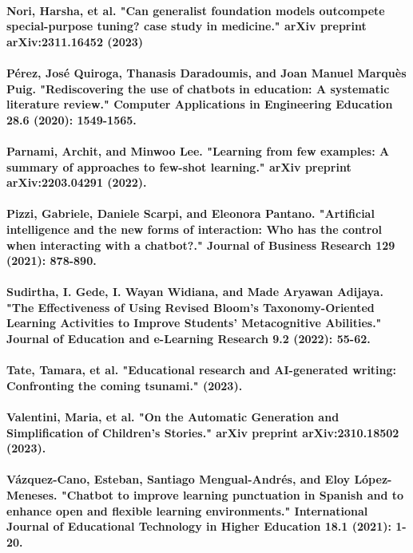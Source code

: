 \documentclass{article}
\begin{document}
\paragraph{Nori, Harsha, et al. "Can generalist foundation models outcompete special-purpose tuning? case study in medicine." arXiv preprint arXiv:2311.16452 (2023)}
\paragraph{Pérez, José Quiroga, Thanasis Daradoumis, and Joan Manuel Marquès Puig. "Rediscovering the use of chatbots in education: A systematic literature review." Computer Applications in Engineering Education 28.6 (2020): 1549-1565.}
\paragraph{Parnami, Archit, and Minwoo Lee. "Learning from few examples: A summary of approaches to few-shot learning." arXiv preprint arXiv:2203.04291 (2022).}
\paragraph{Pizzi, Gabriele, Daniele Scarpi, and Eleonora Pantano. "Artificial intelligence and the new forms of interaction: Who has the control when interacting with a chatbot?." Journal of Business Research 129 (2021): 878-890.}
\paragraph{Sudirtha, I. Gede, I. Wayan Widiana, and Made Aryawan Adijaya. "The Effectiveness of Using Revised Bloom's Taxonomy-Oriented Learning Activities to Improve Students' Metacognitive Abilities." Journal of Education and e-Learning Research 9.2 (2022): 55-62.}
\paragraph{Tate, Tamara, et al. "Educational research and AI-generated writing: Confronting the coming tsunami." (2023).}
\paragraph{Valentini, Maria, et al. "On the Automatic Generation and Simplification of Children's Stories." arXiv preprint arXiv:2310.18502 (2023).}
\paragraph{Vázquez-Cano, Esteban, Santiago Mengual-Andrés, and Eloy López-Meneses. "Chatbot to improve learning punctuation in Spanish and to enhance open and flexible learning environments." International Journal of Educational Technology in Higher Education 18.1 (2021): 1-20.}
\end{document}
